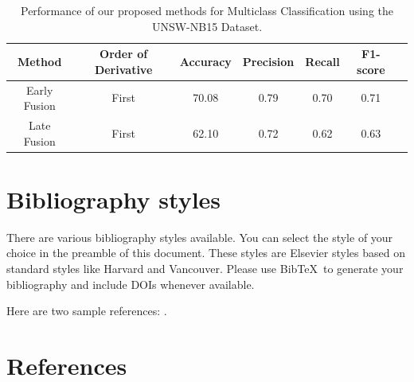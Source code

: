 \documentclass[review]{elsarticle}
\begin{document}
\begin{table}
	\scriptsize
	\centering
	\caption{Performance of our proposed methods for Multiclass Classification using the UNSW-NB15 Dataset.}
	\begin{tabular}{|c|c|c|c|c|c|c|}
		\hline
		Method & Order of Derivative & Accuracy & Precision & Recall & F1-score\\
		\hline
		\hline
		Early Fusion & First & 70.08 & 0.79 & 0.70 & 0.71 \\	
		\hline
		\hline
		Late Fusion & First & 62.10 & 0.72 & 0.62 & 0.63\\
		\hline	
	\end{tabular}
	\label{table3}
\end{table}

\section{Bibliography styles}

There are various bibliography styles available. You can select the style of your choice in the preamble of this document. These styles are Elsevier styles based on standard styles like Harvard and Vancouver. Please use Bib\TeX\ to generate your bibliography and include DOIs whenever available.

Here are two sample references: \cite{Feynman1963118,Dirac1953888}.

\section*{References}


\end{document}
